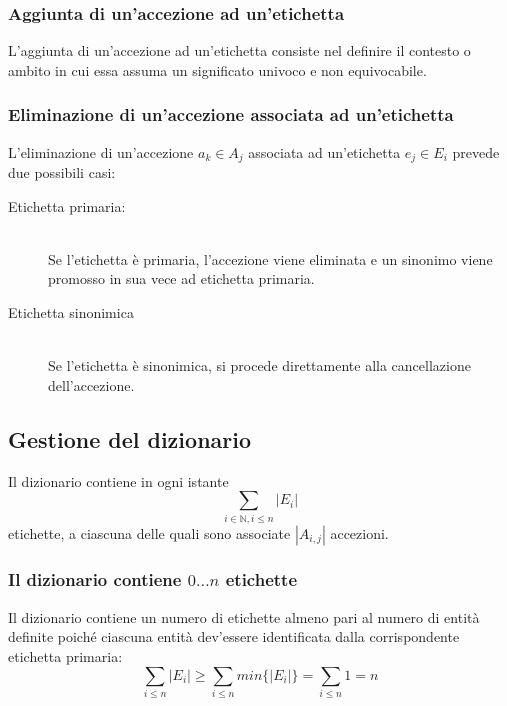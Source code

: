 \documentclass[10pt,a4paper,headinclude,footinclude,hidelinks]{scrreprt} %
\begin{document}

	\subsubsection{Aggiunta di un'accezione ad un'etichetta}
	L'aggiunta di un'accezione ad un'etichetta consiste nel definire il contesto o ambito in cui essa assuma un significato univoco e non equivocabile.

	\subsubsection{Eliminazione di un'accezione associata ad un'etichetta}
	L'eliminazione di un'accezione $a_k \in A_j$ associata ad un'etichetta $e_j \in E_i$ prevede due possibili casi:
	\begin{description}
	\item[Etichetta primaria:] \hfill \\
	Se l'etichetta è primaria, l'accezione viene eliminata e un sinonimo viene promosso in sua vece ad etichetta primaria.
 	\item[Etichetta sinonimica] \hfill \\
	Se l'etichetta è sinonimica, si procede direttamente alla cancellazione dell'accezione.
	\end{description}

	\subsection{Gestione del dizionario}
	Il dizionario contiene in ogni istante
	$$\sum_{i \in \mathbb{N}, i \leq n}\left|E_i\right|$$
	etichette, a ciascuna delle quali sono associate $\left|A_{i,j}\right|$ accezioni.

	\subsubsection{Il dizionario contiene $0\ldots n$ etichette}
	Il dizionario contiene un numero di etichette almeno pari al numero di entità definite poiché ciascuna entità dev'essere identificata dalla corrispondente etichetta primaria:
	$$\sum_{i \leq n}{\left|E_i\right|} \geq \sum_{i \leq n}{min\{\left|E_i\right|\}} = \sum_{i \leq n}{1} = n$$
\end{document}
